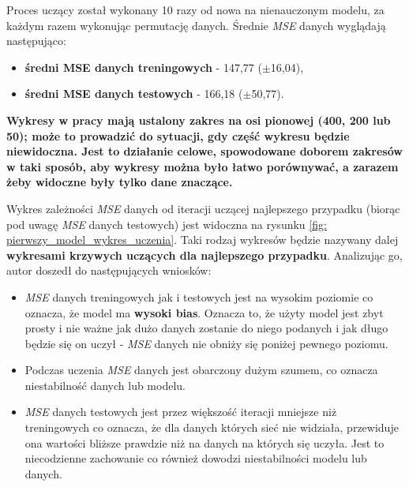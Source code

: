 \documentclass[12pt]{aghdpl}
\begin{document}
		Proces uczący został wykonany 10 razy od nowa na nienauczonym modelu, za każdym razem wykonując permutację danych. Średnie \textit{MSE} danych wyglądają następująco:
		\begin{itemize}
		\item \textbf{średni MSE danych treningowych} - 147,77 ($\pm$16,04),
		\item \textbf{średni MSE danych testowych} - 166,18 ($\pm$50,77).
		\end{itemize}
		
		\textbf{Wykresy w pracy mają ustalony zakres na osi pionowej (400, 200 lub 50); może to prowadzić do sytuacji, gdy część wykresu będzie niewidoczna. Jest to działanie celowe, spowodowane doborem zakresów w taki sposób, aby wykresy można było łatwo porównywać, a zarazem żeby widoczne były tylko dane znaczące.}
		
		Wykres zależności \textit{MSE} danych od iteracji uczącej najlepszego przypadku (biorąc pod uwagę \textit{MSE} danych testowych) jest widoczna na rysunku \ref{fig: pierwszy_model_wykres_uczenia}. Taki rodzaj wykresów będzie nazywany dalej \textbf{wykresami krzywych uczących dla najlepszego przypadku}. Analizując go, autor doszedł do następujących wniosków:
		\begin{itemize}
		\item \textit{MSE} danych treningowych jak i testowych jest na wysokim poziomie co oznacza, że model ma \textbf{wysoki bias}. Oznacza to, że użyty model jest zbyt prosty i nie ważne jak dużo danych zostanie do niego podanych i jak długo będzie się on uczył - \textit{MSE} danych nie obniży się poniżej pewnego poziomu.
		\item Podczas uczenia \textit{MSE} danych jest obarczony dużym szumem, co oznacza niestabilność danych lub modelu.
		\item \textit{MSE} danych testowych jest przez większość iteracji mniejsze niż treningowych co oznacza, że dla danych których sieć nie widziała, przewiduje ona wartości bliższe prawdzie niż na danych na których się uczyła. Jest to niecodzienne zachowanie co również dowodzi niestabilności modelu lub danych.
		\end{itemize}
		
\end{document}
